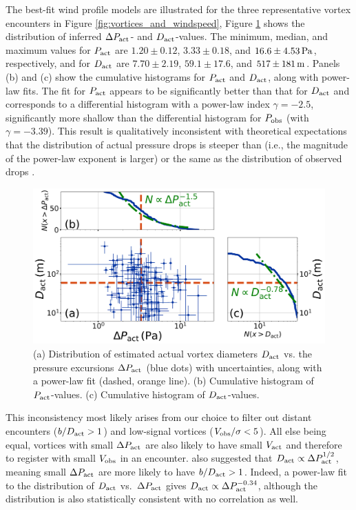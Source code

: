 \documentclass{aastex63}
\begin{document}
The best-fit wind profile models are illustrated for the three representative vortex encounters in Figure \ref{fig:vortices_and_windspeed}, Figure \ref{fig:Dact_vs_Pact} shows the distribution of inferred $\Delta P_{\rm act}$- and $D_{\rm act}$-values. The minimum, median, and maximum values for $P_{\rm act}$ are $1.20\pm0.12$, $3.33\pm0.18$, and $16.6\pm4.53\,{\rm Pa}$, respectively, and for $D_{\rm act}$ are $7.70\pm2.19$, $59.1\pm17.6$, and $517\pm181\,{\rm m}$. Panels (b) and (c) show the cumulative histograms for $P_{\rm act}$ and $D_{\rm act}$, along with power-law fits. The fit for $P_{\rm act}$ appears to be significantly better than that for $D_{\rm act}$ and corresponds to a differential histogram with a power-law index $\gamma = -2.5$, significantly more shallow than the differential histogram for $P_{\rm obs}$ (with $\gamma = -3.39$). This result is qualitatively inconsistent with theoretical expectations that the distribution of actual pressure drops is steeper than (i.e., the magnitude of the power-law exponent is larger) or the same as the distribution of observed drops \citep{2014JAtS...71.4461L, 2018Icar..299..166J, 2019Icar..317..209K}.

\begin{figure}
    \centering
    \includegraphics[width=\textwidth]{figures/Dact_vs_Pact.png}
    \caption{(a) Distribution of estimated actual vortex diameters $D_{\rm act}$ vs. the pressure excursions $\Delta P_{\rm act}$ (blue dots) with uncertainties, along with a power-law fit (dashed, orange line). (b) Cumulative histogram of $P_{\rm act}$-values. (c) Cumulative histogram of $D_{\rm act}$-values.}
    \label{fig:Dact_vs_Pact}
\end{figure}

This inconsistency most likely arises from our choice to filter out distant encounters ($b/D_{\rm act} > 1$) and low-signal vortices ($V_{\rm obs}/\sigma < 5$). All else being equal, vortices with small $\Delta P_{\rm act}$ are also likely to have small $V_{\rm act}$ and therefore to register with small $V_{\rm obs}$ in an encounter. \citet{2020Icar..33813523J} also suggested that $D_{\rm act} \propto \Delta P_{\rm act}^{1/2}$, meaning small $\Delta P_{\rm act}$ are more likely to have $b/D_{\rm act} > 1$. Indeed, a power-law fit to the distribution of $D_{\rm act}$ vs.~$\Delta P_{\rm act}$ gives $D_{\rm act} \propto \Delta P_{\rm act}^{-0.34}$, although the distribution is also statistically consistent with no correlation as well. 
\end{document}
